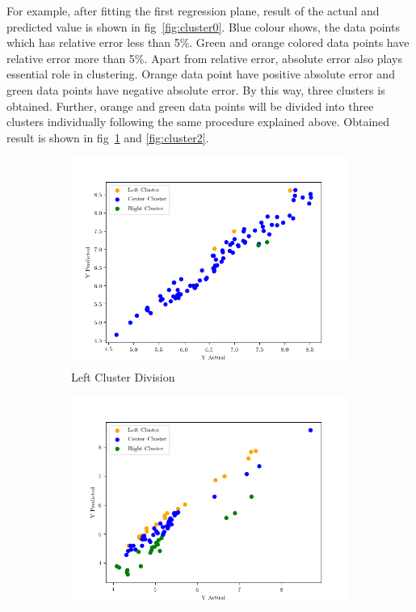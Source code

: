 \documentclass[12pt]{article}
\begin{document}
For example, after fitting the first regression plane, result of the actual and predicted value is shown in fig~\ref{fig:cluster0}. Blue colour shows, the data points which has relative error less than 5\%. Green and orange colored data points have relative error more than 5\%. Apart from relative error, absolute error also plays essential role in clustering. Orange data point have positive absolute error and green data points have negative absolute error. By this way, three clusters is  obtained. Further, orange and green data points will be divided into three clusters individually following the same procedure explained above. Obtained result is shown in fig~\ref{fig:cluster1} and \ref{fig:cluster2}. 
	
\begin{figure}[H]
	\centering
	\begin{subfigure}{.5\textwidth}
		\centering
		\includegraphics[width=1.1\linewidth]{cluster_visulization_1.png}
		\caption{Left Cluster Division}
		\label{fig:cluster1}
	\end{subfigure}%
	\begin{subfigure}{.5\textwidth}
		\centering
		\includegraphics[width=1.1\linewidth]{cluster_visulization_2.png}

\end{subfigure}
\end{figure}
\end{document}

